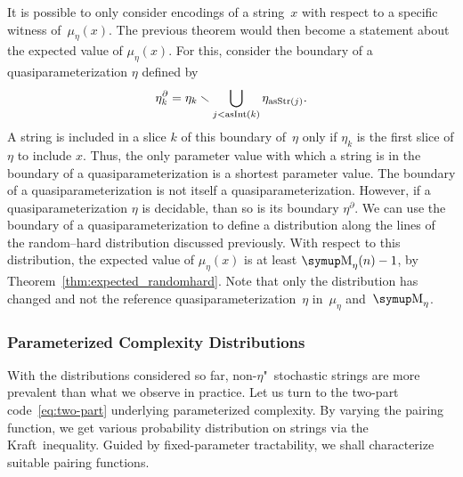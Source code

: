 It is possible to only consider encodings of a string~$x$ with respect to a specific witness of~$\mu_\eta(x)$.
The previous theorem would then become a statement about the expected value of $\mu_\eta(x)$.
For this, consider the boundary of a quasiparameterization $\eta$ defined by
\begin{equation*}
  \eta^\partial_k = \eta_k \smallsetminus \bigcup_{j < \operatorname{asInt}(k)} \eta_{\operatorname{asStr}(j)}.
\end{equation*}
A string is included in a slice $k$ of this boundary of~$\eta$ only if $\eta_k$ is the first slice of $\eta$ to include $x$.
Thus, the only parameter value with which a string is in the boundary of a quasiparameterization is a shortest parameter value.
The boundary of a quasiparameterization is not itself a quasiparameterization.
However, if a quasiparameterization $\eta$ is decidable, than so is its boundary $\eta^\partial$.
We can use the boundary of a quasiparameterization to define a distribution along the lines of the random--hard distribution discussed previously.
With respect to this distribution, the expected value of $\mu_\eta(x)$ is at least $\upM_\eta(n) - 1$, by Theorem~\ref{thm:expected_randomhard}.
Note that only the distribution has changed and not the reference quasiparameterization~$\eta$ in~$\mu_\eta$ and~$\upM_\eta$.

\subsubsection{Parameterized Complexity Distributions}
With the distributions considered so far, non-$\eta$"~stochastic strings are more prevalent than what we observe in practice.
Let us turn to the two-part code~\eqref{eq:two-part} underlying parameterized complexity.
By varying the pairing function, we get various probability distribution on strings via the Kraft~inequality.
Guided by fixed-parameter tractability, we shall characterize suitable pairing functions.

